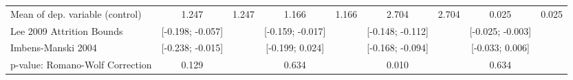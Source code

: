 {\begin{tabular}{l*{8}{c}}
Mean of dep. variable (control)                   &       1.247         &       1.247         &       1.166         &       1.166         &       2.704         &       2.704         &       0.025         &       0.025         \\
Lee 2009 Attrition Bounds                         &[-0.198; -0.057]         &                     &[-0.159; -0.017]         &                     &[-0.148; -0.112]         &                     &[-0.025; -0.003]         &                     \\
Imbens-Manski 2004                                &[-0.238; -0.015]         &                     &[-0.199; 0.024]         &                     &[-0.168; -0.094]         &                     &[-0.033; 0.006]         &                     \\
p-value: Romano-Wolf Correction                   &       0.129         &                     &       0.634         &                     &       0.010         &                     &       0.634         &                     \\
\hline\hline
\end{tabular}
}

